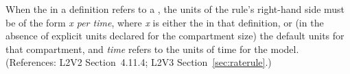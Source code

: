 When the  in a \RateRule definition refers to a
\Compartment, the units of the rule's right-hand side must be of the form
\emph{x per time}, where \emph{x} is either the  in that
\Compartment definition, or (in the absence of explicit units declared for
the compartment size) the default units for that compartment, and
\emph{time} refers to the units of time for the model.  (References: L2V2
Section~4.11.4; L2V3 Section~\ref{sec:raterule}.)
